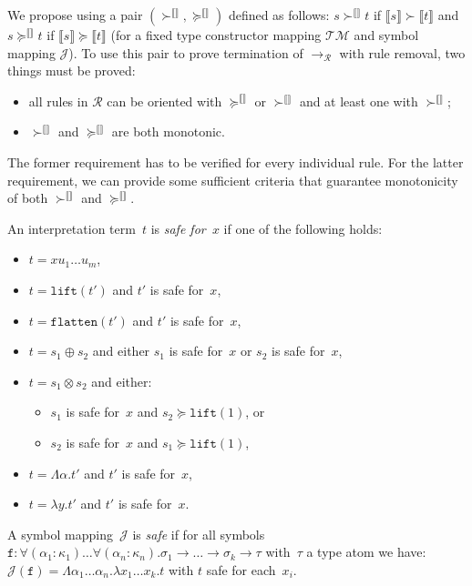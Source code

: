 \documentclass[runningheads,a4paper]{llncs}
\newcommand{\Rules}{\mathcal{R}}
\newcommand{\Typemap}{\mathcal{T\!M}}
\newcommand{\Termmap}{\mathcal{J}}
\newcommand{\succinterpret}{\succ^{\llbracket\rrbracket}}
\newcommand{\succeqinterpret}{\succeq^{\llbracket\rrbracket}}
\newcommand{\interpret}[1]{\llbracket #1 \rrbracket}
\newcommand{\arr}[1]{\longrightarrow_{#1}}
\newcommand{\arrtype}{\rightarrow}
\newcommand{\abs}[2]{\lambda #1.#2}
\newcommand{\tabs}[2]{\Lambda #1.#2}
\newcommand{\flatten}{\mathtt{flatten}}
\newcommand{\lift}{\mathtt{lift}}
\newcommand{\afun}{\mathtt{f}}
\begin{document}
We propose using a pair $(\succinterpret,\succeqinterpret)$ defined as
follows: $s \succinterpret t$ if $\interpret{s} \succ \interpret{t}$ and
$s \succeqinterpret t$ if $\interpret{s} \succeq \interpret{t}$ (for a
fixed type constructor mapping $\Typemap$ and symbol mapping $\Termmap$).
To use this pair to prove termination of $\arr{\Rules}$ with rule removal,
two things must be proved:

\begin{itemize}
\item all rules in $\Rules$ can be oriented with $\succeqinterpret$ or
  $\succinterpret$ and at least one with $\succinterpret$;
\item $\succinterpret$ and $\succeqinterpret$ are both monotonic.
\end{itemize}

The former requirement has to be verified for every individual rule.
For the latter requirement, we can provide some sufficient criteria that
guarantee monotonicity of both $\succinterpret$ and $\succeqinterpret$.

\begin{definition}\normalfont
  An interpretation term~$t$ is \emph{safe for~$x$} if one of the
  following holds:
  \begin{itemize}
  \item $t = x u_1 \ldots u_m$,
  \item $t = \lift(t')$ and $t'$ is safe for~$x$,
  \item $t = \flatten(t')$ and $t'$ is safe for~$x$,
  \item $t = s_1 \oplus s_2$ and either $s_1$ is safe for~$x$ or $s_2$
    is safe for~$x$,
  \item $t = s_1 \otimes s_2$ and either:
    \begin{itemize}
    \item $s_1$ is safe for~$x$ and $s_2 \succeq \lift(1)$, or
    \item $s_2$ is safe for~$x$ and $s_1 \succeq \lift(1)$,
    \end{itemize}
  \item $t = \tabs{\alpha}{t'}$ and $t'$ is safe for~$x$,
  \item $t = \abs{y}{t'}$ and $t'$ is safe for~$x$.
  \end{itemize}
  A symbol mapping~$\Termmap$ is \emph{safe} if for all symbols $\afun
  : \forall (\alpha_1 : \kappa_1) \ldots \forall (\alpha_n : \kappa_n)
  . \sigma_1 \arrtype \ldots \arrtype \sigma_k \arrtype \tau$
  with~$\tau$ a type atom we have: $\Termmap(\afun) = \tabs{\alpha_1
    \dots \alpha_n}{\abs{x_1 \dots x_k}{t}}$ with $t$ safe for
  each~$x_i$.
\end{definition}
\end{document}
